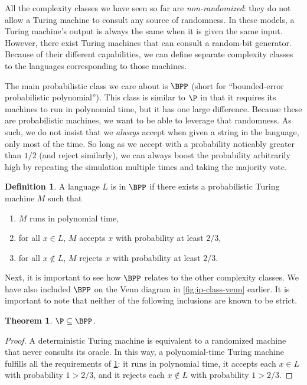 \documentclass[english,12pt]{reedthesis}
\theoremstyle{plain}
\newtheorem{thm}{Theorem}[section]
\theoremstyle{definition}
\newtheorem{defn}[defn]{Definition}
\theoremstyle{remark}
\begin{document}
All the complexity classes we have seen so far are \emph{non-randomized}: they
do not allow a Turing machine to consult any source of randomness. In these
models, a Turing machine's output is always the same when it is given the same
input. However, there exist Turing machines that can consult a random-bit
generator. Because of their different capabilities, we can define separate
complexity classes to the languages corresponding to those machines.

The main probabilistic class we care about is $\BPP$ (short for ``bounded-error
probabilistic polynomial''). This class is similar to $\P$ in that it requires
its machines to run in polynomial time, but it has one large difference. Because
these are probabilistic machines, we want to be able to leverage that
randomness. As such, we do not insist that we \emph{always} accept when given a
string in the language, only most of the time. So long as we accept with a
probability noticably greater than $1/2$ (and reject similarly), we can always
boost the probability arbitrarily high by repeating the simulation multiple
times and taking the majority vote.

\begin{defn}\label{def:bpp}
  A language $L$ is in $\BPP$ if there exists a probabilistic Turing machine $M$
  such that
  \begin{enumerate}
    \item $M$ runs in polynomial time,
    \item for all $x \in L$, $M$ accepts $x$ with probability at least $2/3$,
    \item for all $x \notin L$, $M$ rejects $x$ with probability at least $2/3$.
  \end{enumerate}
\end{defn}

Next, it is important to see how $\BPP$ relates to the other complexity classes.
We have also included $\BPP$ on the Venn diagram in \cref{fig:ip-class-venn}
earlier. It is important to note that neither of the following inclusions are
known to be strict.

\begin{thm}\label{thm:p-subset-bpp}
  $\P \subseteq \BPP$.
\end{thm}

\begin{proof}
  A deterministic Turing machine is equivalent to a randomized machine that
  never consults its oracle. In this way, a polynomial-time Turing machine
  fulfills all the requirements of \cref{def:bpp}: it runs in polynomial time,
  it accepts each $x \in L$ with probability $1 > 2/3$, and it rejects each
  $x \notin L$ with probability $1 > 2/3$.
\end{proof}
\end{document}
